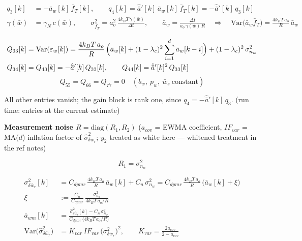 \documentclass[11pt,a4paper,fontset=none]{ctexart}
\begin{document}
\begin{align*}
q_3[k] &= -\bar{a}_w[k]\,\bar{f}_T[k], \qquad
q_4[k] = \hat{\bar{a}}'[k]\,\bar{a}_w[k]\,\bar{f}_T[k]
       = -\hat{\bar{a}}'[k]\,q_3[k] \\
\gamma(\bar{w}) &= \gamma_N\,c(\bar{w}), \qquad
\sigma^2_{\bar{f}_T} = a_o^2\,\frac{4k_BT\,\gamma(\bar{w})}{\Delta t},
\qquad
\bar{a}_w = \frac{\Delta t}{a_o\,\gamma(\bar{w})\,R}
\quad\Longrightarrow\quad
\mathrm{Var}\bigl(\bar{a}_w\bar{f}_T\bigr)
  = \frac{4k_BT\,a_o}{R}\,\bar{a}_w
\end{align*}

\begin{align*}
Q_{33}[k]
  &= \mathrm{Var}(\varepsilon_w[k])
   = \frac{4k_BT\,a_o}{R}\,
     \Bigl(\bar{a}_w[k]
     + (1-\lambda_c)^2\sum_{i=1}^{d}\bar{a}_w[k-i]\Bigr)
   + (1-\lambda_c)^2\,\sigma^2_{n_w} \\
Q_{34}[k] &= Q_{43}[k] = -\hat{\bar{a}}'[k]\,Q_{33}[k], \qquad
Q_{44}[k] = \hat{\bar{a}}'[k]^{2}\,Q_{33}[k]
\end{align*}
\begin{equation*}
Q_{55} = Q_{66} = Q_{77} = 0 \quad
(b_w,\ p_w,\ \bar{w}_s\ \text{constant})
\end{equation*}

All other entries vanish; the gain block is rank one, since
$q_4 = -\hat{\bar{a}}'[k]\,q_3$.  (run time: entries at the current
estimate)

\textbf{Measurement noise $R = \mathrm{diag}(R_1, R_2)$}\quad
($a_{cov}$ = EWMA coefficient, $IF_{var}$ = MA($d$) inflation factor of
$\hat{\sigma}^2_{\delta\bar{w}_r}$; $y_2$ treated as white here ---
whitened treatment in the ref notes)

\begin{equation*}
R_1 = \sigma^2_{n_w}
\end{equation*}

\begin{align*}
\sigma^2_{\delta\bar{w}_r}[k]
  &= C_{dpmr}\,\frac{4k_BT\,a_o}{R}\,\bar{a}_w[k] + C_n\,\sigma^2_{n_w}
   = C_{dpmr}\,\frac{4k_BT\,a_o}{R}\,\bigl(\bar{a}_w[k] + \xi\bigr) \\
\xi &:= \frac{C_n}{C_{dpmr}}\,\frac{\sigma^2_{n_w}}{4k_BT\,a_o/R} \\
\bar{a}_{wm}[k]
  &= \frac{\hat{\sigma}^2_{\delta\bar{w}_r}[k] - C_n\,\sigma^2_{n_w}}
          {C_{dpmr}\,\bigl(4k_BT\,a_o/R\bigr)} \\
\mathrm{Var}\bigl(\hat{\sigma}^2_{\delta\bar{w}_r}\bigr)
  &= K_{var}\,IF_{var}\,\bigl(\sigma^2_{\delta\bar{w}_r}\bigr)^{2},
\qquad
K_{var} = \frac{2a_{cov}}{2-a_{cov}}
\end{align*}
\end{document}
